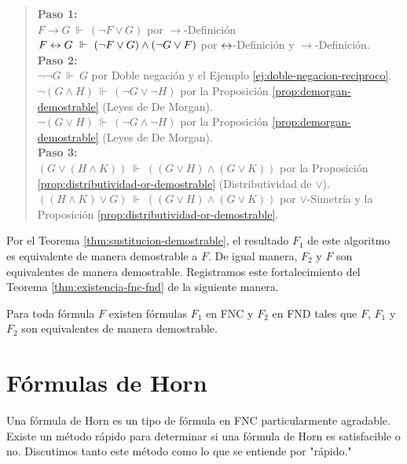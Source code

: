 \documentclass[12pt,a4paper]{book}
\newcommand{\comillas}[1]{"#1"}
\begin{document}
    \begin{quote}
        \textbf{Paso 1:}\\[0.15cm]
        $F\rightarrow G\ \Vdash\ (\neg F\vee G)$ por $\rightarrow$-Definición\\
        $F\leftrightarrow G\ \Vdash\ (\neg F\vee G)\wedge(\neg G\vee F)$ por $\leftrightarrow$-Definición y $\rightarrow$-Definición.\\[0.3cm]
        \textbf{Paso 2:}\\[0.15cm]
        $\neg\neg G\ \Vdash\ G$ por Doble negación y el Ejemplo \ref{ej:doble-negacion-reciproco}.\\
        $\neg(G\wedge H)\ \Vdash\ (\neg G\vee\neg H)$ por la Proposición \ref{prop:demorgan-demostrable} (Leyes de De
        Morgan).\\
        $\neg(G\vee H)\ \Vdash\ (\neg G\wedge\neg H)$ por la Proposición \ref{prop:demorgan-demostrable} (Leyes de De
        Morgan).\\[0.3cm]
        \textbf{Paso 3:}\\[0.15cm]
        $(G\vee(H\wedge K))\ \Vdash\ ((G\vee H)\wedge(G\vee K))$ por la Proposición
        \ref{prop:distributividad-or-demostrable} (Distributividad de $\vee$).\\
        $((H\wedge K)\vee G)\ \Vdash\ ((G\vee H)\wedge(G\vee K))$ por $\vee$-Simetría y la Proposición
        \ref{prop:distributividad-or-demostrable}.
    \end{quote}

    Por el Teorema \ref{thm:sustitucion-demostrable}, el resultado $F_{1}$ de este algoritmo es equivalente de manera
    demostrable a $F$. De igual manera, $F_{2}$ y $F$ son equivalentes de manera demostrable. Registramos este
    fortalecimiento del Teorema \ref{thm:existencia-fnc-fnd} de la siguiente manera.

    \begin{proposicion}\label{prop:fnc-fnd-demostrable}
        Para toda fórmula $F$ existen fórmulas $F_{1}$ en FNC y $F_{2}$ en FND tales que $F$, $F_{1}$ y $F_{2}$ son
        equivalentes de manera demostrable.
    \end{proposicion}

    \section{Fórmulas de Horn}

    Una fórmula de Horn es un tipo de fórmula en FNC particularmente agradable. Existe un método rápido para determinar si
    una fórmula de Horn es satisfacible o no. Discutimos tanto este método como lo que se entiende por \comillas{rápido.}
\end{document}
